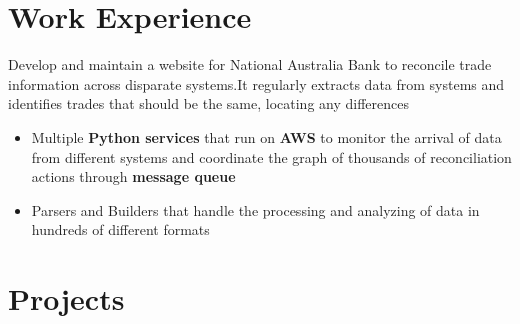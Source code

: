 \documentclass{resume}
\begin{document}
\section{Work Experience}
\begin{flushleft}
Develop and maintain a website for National Australia Bank to reconcile trade information across disparate systems.\linebreak It regularly extracts data from systems and identifies trades that should be the same, locating any differences
\begin{itemize}
  \item Multiple \textbf{Python services} that run on \textbf{AWS} to monitor the arrival of data from different systems and \linebreak coordinate the graph of thousands of reconciliation actions through \textbf{message queue}
  \item Parsers and Builders that handle the processing and analyzing of data in hundreds of different formats
\end{itemize}
\end{flushleft}

\section{Projects}
\end{document}
